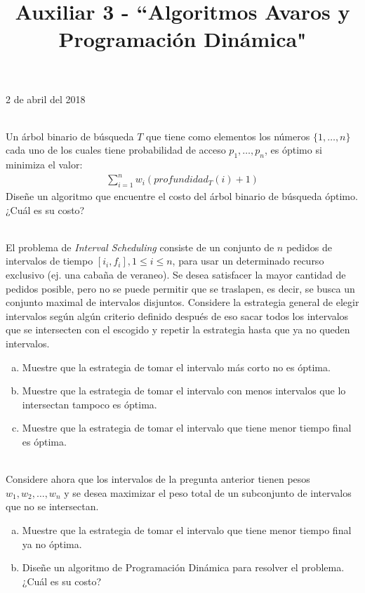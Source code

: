 \documentclass[dcc,uchile]{fcfmcourse}
\title{Auxiliar 3 - ``Algoritmos Avaros y Programación Dinámica"}
\theoremstyle{plain}
\theoremstyle{definition}
\begin{document}
\maketitle
\begin{center}
2 de abril del 2018
\end{center}


\vspace{-1ex}


\begin{problems}

\\
Un árbol binario de búsqueda $T$ que tiene como elementos los números $\{1,\ldots,n\}$ cada uno de los cuales tiene probabilidad de acceso $p_{1},\ldots,p_{n}$, es óptimo si minimiza el valor:
\begin{align*}
    \sum_{i=1}^{n}w_{i}(profundidad_{T}(i) + 1)
\end{align*}
Diseñe un algoritmo que encuentre el costo del árbol binario de búsqueda óptimo. ¿Cuál es su costo?


\\
El problema de \textit{Interval Scheduling} consiste de un conjunto de $n$ pedidos de intervalos de tiempo $[i_{i}, f_{i}], 1 \le i \le n$, para usar un determinado recurso exclusivo (ej. una cabaña de veraneo). Se desea satisfacer la mayor cantidad de pedidos posible, pero no se puede permitir que se traslapen, es decir, se busca un conjunto maximal de intervalos disjuntos. Considere la estrategia general de elegir intervalos según algún criterio definido después de eso sacar todos los intervalos que se intersecten con el escogido y repetir la estrategia hasta que ya no queden intervalos.

\begin{enumerate}[a)]
\item Muestre que la estrategia de tomar el intervalo más corto no es óptima.
\item Muestre que la estrategia de tomar el intervalo con menos intervalos que lo intersectan tampoco es óptima.
\item Muestre que la estrategia de tomar el intervalo que tiene menor tiempo final es óptima.
\end{enumerate}

\\
Considere ahora que los intervalos de la pregunta anterior tienen pesos $w_{1}, w_{2}, \ldots, w_{n}$ y se desea maximizar el peso total de un subconjunto de intervalos que no se intersectan.
\begin{enumerate}[a)]
    \item Muestre que la estrategia de tomar el intervalo que tiene menor tiempo final ya no óptima.
    \item Diseñe un algoritmo de Programación Dinámica para resolver el problema. ¿Cuál es su costo?
\end{enumerate}
\end{problems}
\end{document}
